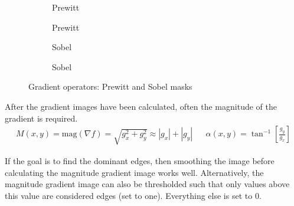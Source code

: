 \begin{figure}[!h]
	\centering
	\begin{subfigure}[b]{0.2\textwidth}
		\centering
		\caption{Prewitt}
	\end{subfigure}
	\begin{subfigure}[b]{0.2\textwidth}
		\centering
		\caption{Prewitt}
	\end{subfigure}
	\begin{subfigure}[b]{0.2\textwidth}
		\centering
		\caption{Sobel}
	\end{subfigure}
	\begin{subfigure}[b]{0.2\textwidth}
		\centering
		\caption{Sobel}
	\end{subfigure}
	\caption{Gradient operators: Prewitt and Sobel masks}
\end{figure}

After the gradient images have been calculated, often the magnitude of the gradient is required.
\begin{align*}
	M(x,y) = \text{mag}(\nabla f) = \sqrt{g_x^2 + g_y^2} \approx |g_x|+|g_y| && \alpha(x,y) = \tan^{-1} \left[ \frac{g_y}{g_x} \right]
\end{align*}

If the goal is to find the dominant edges, then smoothing the image before calculating the magnitude gradient image works well. Alternatively, the magnitude gradient image can also be thresholded such that only values above this value are considered edges (set to one). Everything else is set to 0.
